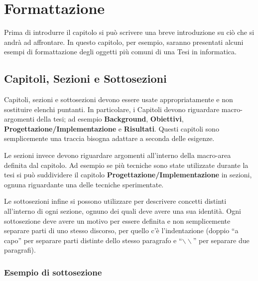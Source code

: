 \chapter{Formattazione}\label{chapter:formattazione}
Prima di introdurre il capitolo si può scrivere una breve introduzione su ciò che si andrà ad affrontare.
In questo capitolo, per esempio, saranno presentati alcuni esempi di formattazione degli oggetti più comuni di una Tesi in informatica.


\section{Capitoli, Sezioni e Sottosezioni}\label{sec:cap_sec_subsec}
Capitoli, sezioni e sottosezioni devono essere usate appropriatamente e non sostituire elenchi puntanti.
In particolare, i Capitoli devono riguardare macro-argomenti della tesi; ad esempio \textbf{Background}, \textbf{Obiettivi}, \textbf{Progettazione/Implementazione} e \textbf{Risultati}.
Questi capitoli sono semplicemente una traccia bisogna adattare a seconda delle esigenze.

Le sezioni invece devono riguardare argomenti all'interno della macro-area definita dal capitolo.
Ad esempio se più tecniche sono state utilizzate durante la tesi si può suddividere il capitolo \textbf{Progettazione/Implementazione} in sezioni, ognuna riguardante una delle tecniche sperimentate.

Le sottosezioni infine si possono utilizzare per descrivere concetti distinti all'interno di ogni sezione, ognuno dei quali deve avere una sua identità.
Ogni sottosezione deve avere un motivo per essere definita e non semplicemente separare parti di uno stesso discorso, per quello c'è l'indentazione (doppio ``a capo'' per separare parti distinte dello stesso paragrafo e ``$\backslash\backslash$'' per separare due paragrafi).

\subsection{Esempio di sottosezione}\label{subsec:es_subsec}
\lipsum[1-2]

